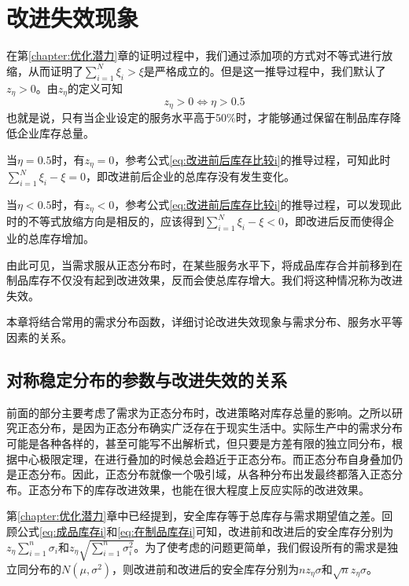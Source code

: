 
\chapter{改进失效现象}

在第\ref{chapter:优化潜力}章的证明过程中，我们通过添加项的方式对不等式进行放缩，从而证明了$\sum_{i=1}^N\xi_i > \xi$是严格成立的。但是这一推导过程中，我们默认了$z_\eta>0$。由$z_\eta$的定义可知
\[
z_\eta>0 \Longleftrightarrow \eta > 0.5
\]
也就是说，只有当企业设定的服务水平高于50\%时，才能够通过保留在制品库存降低企业库存总量。

当$\eta=0.5$时，有$z_\eta=0$，参考公式\ref{eq:改进前后库存比较i}的推导过程，可知此时$\sum_{i=1}^N\xi_i - \xi = 0$，即改进前后企业的总库存没有发生变化。

当$\eta<0.5$时，有$z_\eta<0$，参考公式\ref{eq:改进前后库存比较i}的推导过程，可以发现此时的不等式放缩方向是相反的，应该得到$\sum_{i=1}^N\xi_i - \xi < 0$，即改进后反而使得企业的总库存增加。

由此可见，当需求服从正态分布时，在某些服务水平下，将成品库存合并前移到在制品库存不仅没有起到改进效果，反而会使总库存增大。我们将这种情况称为改进失效。

本章将结合常用的需求分布函数，详细讨论改进失效现象与需求分布、服务水平等因素的关系。







\section{对称稳定分布的参数与改进失效的关系}

前面的部分主要考虑了需求为正态分布时，改进策略对库存总量的影响。之所以研究正态分布，是因为正态分布确实广泛存在于现实生活中。实际生产中的需求分布可能是各种各样的，甚至可能写不出解析式，但只要是方差有限的独立同分布，根据中心极限定理，在进行叠加的时候总会趋近于正态分布。而正态分布自身叠加仍是正态分布。因此，正态分布就像一个吸引域，从各种分布出发最终都落入正态分布。正态分布下的库存改进效果，也能在很大程度上反应实际的改进效果。

第\ref{chapter:优化潜力}章中已经提到，安全库存等于总库存与需求期望值之差。回顾公式\ref{eq:成品库存i}和\ref{eq:在制品库存i}可知，改进前和改进后的安全库存分别为$z_{\eta}\sum_{i=1}^n\sigma_i$和$z_\eta\sqrt{\sum_{i=1}^n\sigma_i^2}$。为了使考虑的问题更简单，我们假设所有的需求是独立同分布的$N(\mu,\sigma^2)$，则改进前和改进后的安全库存分别为$nz_\eta\sigma$和$\sqrt{n}z_\eta\sigma$。

